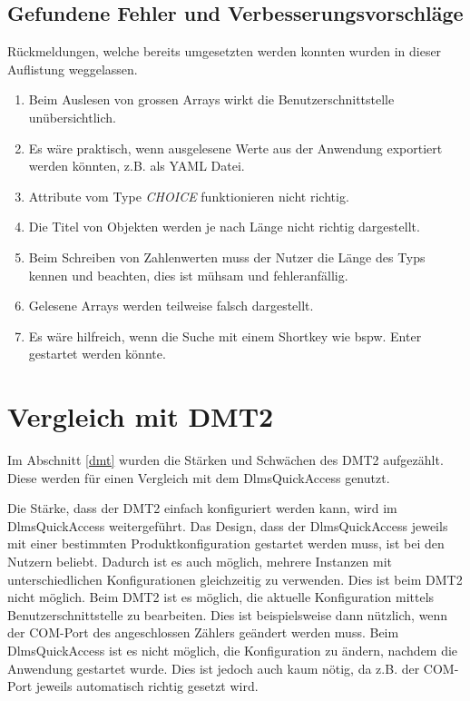 \subsection{Gefundene Fehler und Verbesserungsvorschläge}
Rückmeldungen, welche bereits umgesetzten werden konnten wurden in dieser Auflistung weggelassen.
\begin{enumerate}
   \item Beim Auslesen von grossen Arrays wirkt die Benutzerschnittstelle unübersichtlich.
   \item Es wäre praktisch, wenn ausgelesene Werte aus der Anwendung exportiert werden könnten, z.B. als \ac{YAML} Datei.
   \item Attribute vom Type \textit{CHOICE} funktionieren nicht richtig.
   \item Die Titel von Objekten werden je nach Länge nicht richtig dargestellt.
   \item Beim Schreiben von Zahlenwerten muss der Nutzer die Länge des Typs kennen und beachten, dies ist mühsam und fehleranfällig.
   \item Gelesene Arrays werden teilweise falsch dargestellt.
   \item Es wäre hilfreich, wenn die Suche mit einem Shortkey wie bspw. Enter gestartet werden könnte.
\end{enumerate}

\section{Vergleich mit DMT2}
Im Abschnitt \ref{dmt} wurden die Stärken und Schwächen des \ac{DMT2} aufgezählt.
Diese werden für einen Vergleich mit dem DlmsQuickAccess genutzt.

Die Stärke, dass der \ac{DMT2} einfach konfiguriert werden kann, wird im DlmsQuickAccess weitergeführt.
Das Design, dass der DlmsQuickAccess jeweils mit einer bestimmten Produktkonfiguration gestartet werden muss, ist bei den Nutzern beliebt.
Dadurch ist es auch möglich, mehrere Instanzen mit unterschiedlichen Konfigurationen gleichzeitig zu verwenden.
Dies ist beim \ac{DMT2} nicht möglich.
Beim \ac{DMT2} ist es möglich, die aktuelle Konfiguration mittels Benutzerschnittstelle zu bearbeiten.
Dies ist beispielsweise dann nützlich, wenn der COM-Port des angeschlossen Zählers geändert werden muss.
Beim DlmsQuickAccess ist es nicht möglich, die Konfiguration zu ändern, nachdem die Anwendung gestartet wurde.
Dies ist jedoch auch kaum nötig, da z.B. der COM-Port jeweils automatisch richtig gesetzt wird.

